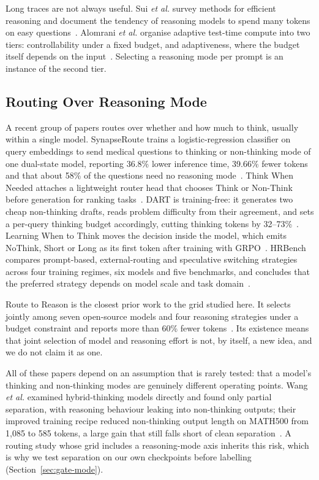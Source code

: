 Long traces are not always useful. Sui \emph{et al.} survey methods for
efficient reasoning and document the tendency of reasoning models to spend
many tokens on easy questions~\cite{sui2025stopoverthinking}. Alomrani
\emph{et al.} organise adaptive test-time compute into two tiers:
controllability under a fixed budget, and adaptiveness, where the budget
itself depends on the input~\cite{alomrani2025reasoningbudget}. Selecting a
reasoning mode per prompt is an instance of the second tier.

\subsection{Routing Over Reasoning Mode}
\label{sec:lit-mode-routing}

A recent group of papers routes over whether and how much to think, usually
within a single model. SynapseRoute trains a logistic-regression classifier
on query embeddings to send medical questions to thinking or non-thinking
mode of one dual-state model, reporting 36.8\% lower inference time, 39.66\%
fewer tokens and that about 58\% of the questions need no reasoning
mode~\cite{zhang2025synapseroute}. Think When Needed attaches a
lightweight router head that chooses Think or Non-Think before generation
for ranking tasks~\cite{guo2026thinkwhenneeded}. DART is training-free: it
generates two cheap non-thinking drafts, reads problem difficulty from their
agreement, and sets a per-query thinking budget accordingly, cutting
thinking tokens by 32--73\%~\cite{lee2026dart}. Learning When to Think moves
the decision inside the model, which emits NoThink, Short or Long as its
first token after training with GRPO~\cite{kassenaar2026learningwhentothink}.
HRBench compares prompt-based, external-routing and speculative switching
strategies across four training regimes, six models and five benchmarks, and
concludes that the preferred strategy depends on model scale and task
domain~\cite{ning2026hrbench}.

Route to Reason is the closest prior work to the grid studied here. It
selects jointly among seven open-source models and four reasoning strategies
under a budget constraint and reports more than 60\% fewer
tokens~\cite{pan2026routetoreason}. Its existence means that joint selection
of model and reasoning effort is not, by itself, a new idea, and we do not
claim it as one.

All of these papers depend on an assumption that is rarely tested: that a
model's thinking and non-thinking modes are genuinely different operating
points. Wang \emph{et al.} examined hybrid-thinking models directly and found
only partial separation, with reasoning behaviour leaking into non-thinking
outputs; their improved training recipe reduced non-thinking output length on
MATH500 from 1{,}085 to 585 tokens, a large gain that still falls short of
clean separation~\cite{wang2025demystifying}. A routing study whose grid
includes a reasoning-mode axis inherits this risk, which is why we test
separation on our own checkpoints before labelling
(Section~\ref{sec:gate-mode}).

